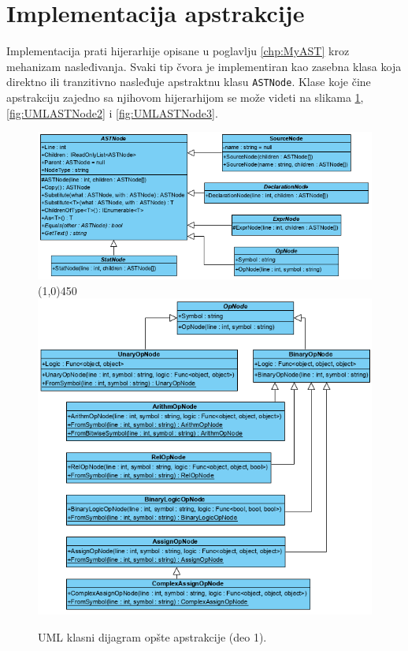 \section{Implementacija apstrakcije}
\label{sec:ImplementationMyAST}

Implementacija prati hijerarhije opisane u poglavlju \ref{chp:MyAST} kroz mehanizam nasleđivanja. Svaki tip čvora je implementiran kao zasebna klasa koja direktno ili tranzitivno nasleđuje apstraktnu klasu \texttt{ASTNode}. Klase koje čine apstrakciju zajedno sa njihovom hijerarhijom se može videti na slikama \ref{fig:UMLASTNode1}, \ref{fig:UMLASTNode2} i \ref{fig:UMLASTNode3}. 

\begin{figure}[h!]
\centering
\includegraphics[scale=0.7]{images/uml/ASTNode.png}
\line(1,0){450}\\
\includegraphics[scale=0.7]{images/uml/OperatorNode.png}
\caption{UML klasni dijagram opšte apstrakcije (deo 1).}
\label{fig:UMLASTNode1}
\end{figure}

